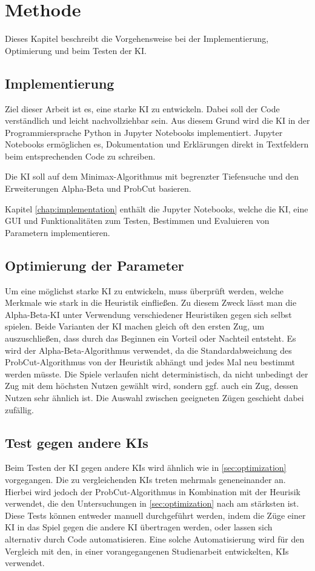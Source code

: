 
\chapter{Methode}
\label{chap:methode}

Dieses Kapitel beschreibt die Vorgehensweise bei der Implementierung, Optimierung und beim Testen der \ac{KI}.

\section{Implementierung}
Ziel dieser Arbeit ist es, eine starke \ac{KI} zu entwickeln. Dabei soll der Code verständlich und leicht
nachvollziehbar sein. Aus diesem Grund wird die \ac{KI} in der Programmiersprache Python in Jupyter Notebooks
implementiert. Jupyter Notebooks ermöglichen es, Dokumentation und Erklärungen direkt in Textfeldern beim entsprechenden
Code zu schreiben.

Die \ac{KI} soll auf dem Minimax-Algorithmus mit begrenzter Tiefensuche und den Erweiterungen Alpha-Beta und ProbCut
basieren.

Kapitel \ref{chap:implementation} enthält die Jupyter Notebooks, welche die \ac{KI}, eine \ac{GUI} und Funktionalitäten
zum Testen, Bestimmen und Evaluieren von Parametern implementieren.

\section{Optimierung der Parameter}
\label{sec:optimization}
Um eine möglichst starke \ac{KI} zu entwickeln, muss überprüft werden, welche Merkmale wie stark in die Heuristik
einfließen. Zu diesem Zweck lässt man die Alpha-Beta-\ac{KI} unter Verwendung verschiedener Heuristiken gegen sich
selbst spielen. Beide Varianten der \ac{KI} machen gleich oft den ersten Zug, um auszuschließen, dass durch das Beginnen
ein Vorteil oder Nachteil entsteht. Es wird der Alpha-Beta-Algorithmus verwendet, da die Standardabweichung des
ProbCut-Algorithmus von der Heuristik abhängt und jedes Mal neu bestimmt werden müsste. Die Spiele verlaufen nicht
deterministisch, da nicht unbedingt der Zug mit dem höchsten Nutzen gewählt wird, sondern ggf. auch ein Zug, dessen
Nutzen sehr ähnlich ist. Die Auswahl zwischen geeigneten Zügen geschieht dabei zufällig.

\section{Test gegen andere KIs}
Beim Testen der \ac{KI} gegen andere \acp{KI} wird ähnlich wie in \autoref{sec:optimization} vorgegangen. Die zu
vergleichenden \acp{KI} treten mehrmals geneneinander an. Hierbei wird jedoch der ProbCut-Algorithmus in Kombination mit
der Heurisik verwendet, die den Untersuchungen in \autoref{sec:optimization} nach am stärksten ist. Diese Tests können
entweder manuell durchgeführt werden, indem die Züge einer \ac{KI} in das Spiel gegen die andere \ac{KI} übertragen
werden, oder lassen sich alternativ durch Code automatisieren. Eine solche Automatisierung wird für den Vergleich mit den, in
einer vorangegangenen Studienarbeit entwickelten, \acp{KI} verwendet.
